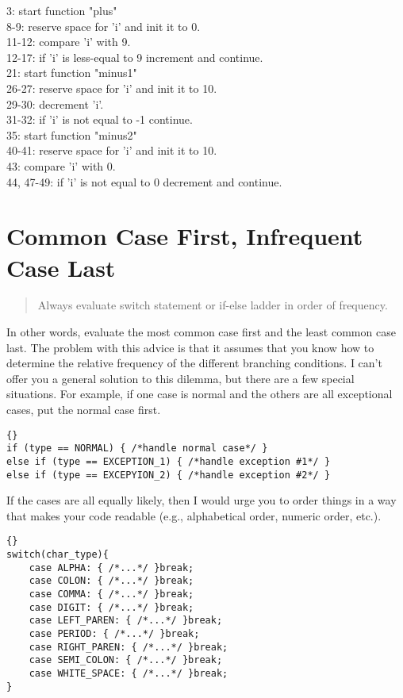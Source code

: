 \documentclass{report}
\begin{document}
\begin{minipage}[t]{8cm}



\small
3: start function "plus"\\
8-9: reserve space for 'i' and init it to 0.\\
11-12: compare 'i' with 9.\\
12-17: if 'i' is less-equal to 9 increment and continue.\\

21: start function "minus1"\\ 
26-27: reserve space for 'i' and init it to 10.\\
29-30: decrement 'i'.\\
31-32: if 'i' is not equal to -1 continue.\\

35: start function "minus2"\\ 
40-41: reserve space for 'i' and init it to 10.\\
43: compare 'i' with 0.\\
44, 47-49: if 'i' is not equal to 0 decrement and continue.\\

\end{minipage}
\begin{minipage}[t]{7cm}

\end{minipage}


\section{Common Case First, Infrequent Case Last}
\begin{quote}
Always evaluate switch statement or if-else ladder in order of frequency.
\end{quote}
In other words, evaluate the most common case first and the least common case last. The problem with this advice is that it assumes that you know how to determine the relative frequency of the different branching conditions. I can't offer you a general solution to this dilemma, but there are a few special situations. For example, if one case is normal and the others are all exceptional cases, put the normal case first.
\begin{lstlisting}{}
if (type == NORMAL) { /*handle normal case*/ }
else if (type == EXCEPTION_1) { /*handle exception #1*/ }
else if (type == EXCEPYION_2) { /*handle exception #2*/ }
\end{lstlisting}
If the cases are all equally likely, then I would urge you to order things in a way that makes your code readable (e.g., alphabetical order, numeric order, etc.).
\begin{lstlisting}{}
switch(char_type){
    case ALPHA: { /*...*/ }break;
    case COLON: { /*...*/ }break;
    case COMMA: { /*...*/ }break;
    case DIGIT: { /*...*/ }break;
    case LEFT_PAREN: { /*...*/ }break;
    case PERIOD: { /*...*/ }break;
    case RIGHT_PAREN: { /*...*/ }break;
    case SEMI_COLON: { /*...*/ }break;
    case WHITE_SPACE: { /*...*/ }break;
}
\end{lstlisting}
\end{document}
